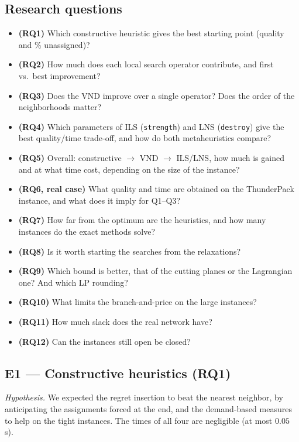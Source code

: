 \documentclass[11pt,a4paper]{article}
\newcommand{\code}[1]{\texttt{#1}}
\begin{document}
\subsection{Research questions}
\begin{itemize}
  \item \textbf{(RQ1)} Which constructive heuristic gives the best starting point (quality and \%
        unassigned)?
  \item \textbf{(RQ2)} How much does each local search operator contribute, and first vs.\ best
        improvement?
  \item \textbf{(RQ3)} Does the VND improve over a single operator? Does the order of the
        neighborhoods matter?
  \item \textbf{(RQ4)} Which parameters of ILS (\code{strength}) and LNS (\code{destroy}) give the
        best quality/time trade-off, and how do both metaheuristics compare?
  \item \textbf{(RQ5)} Overall: constructive $\to$ VND $\to$ ILS/LNS, how much is gained and at
        what time cost, depending on the size of the instance?
  \item \textbf{(RQ6, real case)} What quality and time are obtained on the ThunderPack instance,
        and what does it imply for Q1--Q3?
  \item \textbf{(RQ7)} How far from the optimum are the heuristics, and how many instances do the
        exact methods solve?
  \item \textbf{(RQ8)} Is it worth starting the searches from the relaxations?
  \item \textbf{(RQ9)} Which bound is better, that of the cutting planes or the Lagrangian one? And
        which LP rounding?
  \item \textbf{(RQ10)} What limits the branch-and-price on the large instances?
  \item \textbf{(RQ11)} How much slack does the real network have?
  \item \textbf{(RQ12)} Can the instances still open be closed?
\end{itemize}

\subsection{E1 --- Constructive heuristics (RQ1)}
\emph{Hypothesis.} We expected the regret insertion to beat the nearest neighbor, by anticipating
the assignments forced at the end, and the demand-based measures to help on the tight instances.
The times of all four are negligible (at most $0.05$\,s).
\end{document}
